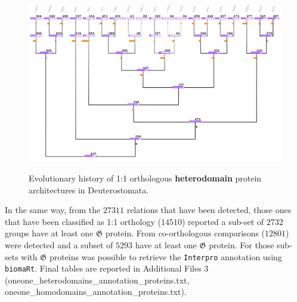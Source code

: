 \documentclass[11pt]{article}
\newcommand{\TODO}[1]{\begingroup\color{red}#1\endgroup}
\begin{document}
\begin{figure}[ht!]
\centering
\includegraphics[scale=0.53]{figures/provisionalDolloHeterodomains} \\
\caption{Evolutionary history of 1:1 orthologous \textbf{heterodomain} protein 
architectures in Deuterostomata.}
\label{fig:dollooneoneheterodomain}
\end{figure}

In the same way, from the $27311$ relations that have been detected, 
those ones that have been classified as 1:1 orthology ($14510$) reported a 
sub-set of $2732$ groups have at least one $\boldsymbol{\mathfrak{G}}$ protein.
From co-orthologous comparisons ($12801$) were detected and a subset 
of $5293$ have at least one $\boldsymbol{\mathfrak{G}}$ protein. 
For those sub-sets with $\boldsymbol{\mathfrak{G}}$ proteins was possible 
to retrieve the \texttt{Interpro} annotation using \texttt{biomaRt}. 
\TODO{Final tables are reported in Additional Files 3 (oneone\_heterodomains\_annotation\_proteins.txt, oneone\_homodomains\_annotation\_proteins.txt)}.
\end{document}
